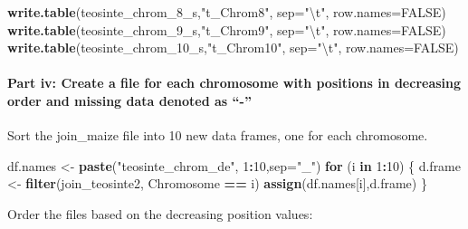 \documentclass[]{article}
\newenvironment{Shaded}{\begin{snugshade}}{\end{snugshade}}
\newcommand{\CharTok}[1]{\textcolor[rgb]{0.31,0.60,0.02}{#1}}
\newcommand{\ControlFlowTok}[1]{\textcolor[rgb]{0.13,0.29,0.53}{\textbf{#1}}}
\newcommand{\DataTypeTok}[1]{\textcolor[rgb]{0.13,0.29,0.53}{#1}}
\newcommand{\DecValTok}[1]{\textcolor[rgb]{0.00,0.00,0.81}{#1}}
\newcommand{\KeywordTok}[1]{\textcolor[rgb]{0.13,0.29,0.53}{\textbf{#1}}}
\newcommand{\NormalTok}[1]{#1}
\newcommand{\OperatorTok}[1]{\textcolor[rgb]{0.81,0.36,0.00}{\textbf{#1}}}
\newcommand{\OtherTok}[1]{\textcolor[rgb]{0.56,0.35,0.01}{#1}}
\newcommand{\StringTok}[1]{\textcolor[rgb]{0.31,0.60,0.02}{#1}}
\let\oldparagraph\paragraph
\renewcommand{\paragraph}[1]{\oldparagraph{#1}\mbox{}}
\begin{document}
\begin{Shaded}
\begin{Highlighting}[]
\KeywordTok{write.table}\NormalTok{(teosinte_chrom_}\DecValTok{8}\NormalTok{_s,}\StringTok{"t_Chrom8"}\NormalTok{, }\DataTypeTok{sep=}\StringTok{"}\CharTok{\textbackslash{}t}\StringTok{"}\NormalTok{, }\DataTypeTok{row.names=}\OtherTok{FALSE}\NormalTok{)}
\KeywordTok{write.table}\NormalTok{(teosinte_chrom_}\DecValTok{9}\NormalTok{_s,}\StringTok{"t_Chrom9"}\NormalTok{, }\DataTypeTok{sep=}\StringTok{"}\CharTok{\textbackslash{}t}\StringTok{"}\NormalTok{, }\DataTypeTok{row.names=}\OtherTok{FALSE}\NormalTok{)}
\KeywordTok{write.table}\NormalTok{(teosinte_chrom_}\DecValTok{10}\NormalTok{_s,}\StringTok{"t_Chrom10"}\NormalTok{, }\DataTypeTok{sep=}\StringTok{"}\CharTok{\textbackslash{}t}\StringTok{"}\NormalTok{, }\DataTypeTok{row.names=}\OtherTok{FALSE}\NormalTok{)}
\end{Highlighting}
\end{Shaded}

\hypertarget{part-iv-create-a-file-for-each-chromosome-with-positions-in-decreasing-order-and-missing-data-denoted-as---1}{%
\paragraph{Part iv: Create a file for each chromosome with positions in
decreasing order and missing data denoted as
``-''}\label{part-iv-create-a-file-for-each-chromosome-with-positions-in-decreasing-order-and-missing-data-denoted-as---1}}

Sort the join\_maize file into 10 new data frames, one for each
chromosome.

\begin{Shaded}
\begin{Highlighting}[]
\NormalTok{df.names <-}\StringTok{ }\KeywordTok{paste}\NormalTok{(}\StringTok{"teosinte_chrom_de"}\NormalTok{, }\DecValTok{1}\OperatorTok{:}\DecValTok{10}\NormalTok{,}\DataTypeTok{sep=}\StringTok{"_"}\NormalTok{)}
\ControlFlowTok{for}\NormalTok{ (i }\ControlFlowTok{in} \DecValTok{1}\OperatorTok{:}\DecValTok{10}\NormalTok{) \{}
\NormalTok{  d.frame <-}\StringTok{ }\KeywordTok{filter}\NormalTok{(join_teosinte2, Chromosome }\OperatorTok{==}\StringTok{ }\NormalTok{i)}
  \KeywordTok{assign}\NormalTok{(df.names[i],d.frame)}
\NormalTok{\}}
\end{Highlighting}
\end{Shaded}

Order the files based on the decreasing position values:
\end{document}
